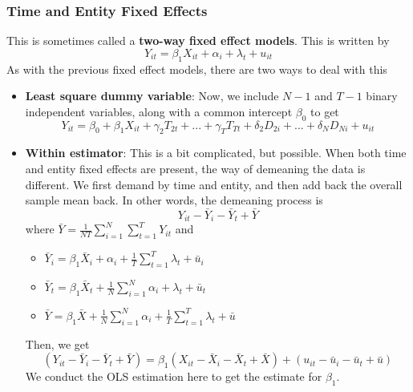 \documentclass[12pt]{article}
\theoremstyle{definition}
\theoremstyle{property}
\theoremstyle{assumption}
\theoremstyle{example}
\theoremstyle{comment}
\begin{document}
\subsubsection{Time and Entity Fixed Effects}
This is sometimes called a \textbf{two-way fixed effect models}. This is written by
\[
Y_{it}=\beta_1 X_{it} + \alpha_i +\lambda_t + u_{it}
\]
As with the previous fixed effect models, there are two ways to deal with this
\begin{itemize}
\item \textbf{Least square dummy variable}: Now, we include $N-1$ and $T-1$ binary independent variables, along with a common intercept $\beta_0$ to get
\[
Y_{it} = \beta_0 +\beta_1X_{it}+\gamma_2T_{2t}+...+\gamma_TT_{Tt}+\delta_2D_{2i} + ... + \delta_ND_{Ni}+u_{it} 
\]
\item \textbf{Within estimator}: This is a bit complicated, but possible. When both time and entity fixed effects are present, the way of demeaning the data is different. We first demand by time and entity, and then add back the overall sample mean back. In other words, the demeaning process is 
\[
Y_{it}-\bar{Y}_i -\bar{Y}_t +\bar{Y}
\]
where $\bar{Y} = \frac{1}{NT}\sum_{i=1}^N \sum_{t=1}^TY_{it}$ and 
\begin{itemize}
\item $\bar{Y}_i = \beta_1 \bar{X}_i +\alpha_i +\frac{1}{T}\sum_{t=1}^T\lambda_t+\bar{u}_i$
\item $\bar{Y}_t = \beta_1 \bar{X}_t +\frac{1}{N}\sum_{i=1}^N\alpha_i +\lambda_t+\bar{u}_t$
\item $\bar{Y}  =\beta_1\bar{X}+\frac{1}{N}\sum_{i=1}^N\alpha_i+\frac{1}{T}\sum_{t=1}^T\lambda_t+\bar{u}$
\end{itemize}
Then, we get
\[
(Y_{it}-\bar{Y}_i -\bar{Y}_t +\bar{Y}) = \beta_1(X_{it}-\bar{X}_i -\bar{X}_t +\bar{X}) + (u_{it}-\bar{u}_i -\bar{u}_t +\bar{u})
\]
We conduct the OLS estimation here to get the estimate for $\beta_1$. 
\end{itemize}
\end{document}
